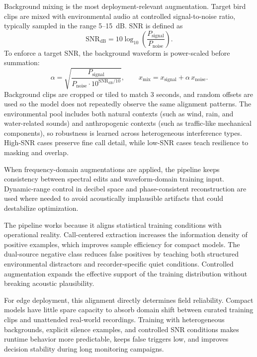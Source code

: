 \documentclass[a4paper,singleside,12pt]{report} %
\begin{document}
	Background mixing is the most deployment-relevant augmentation. Target bird clips are mixed with environmental audio at controlled signal-to-noise ratio, typically sampled in the range 5--15~dB. SNR is defined as
	\begin{equation}
		\mathrm{SNR}_{\mathrm{dB}} = 10 \log_{10}\!\left(\frac{P_{\mathrm{signal}}}{P_{\mathrm{noise}}}\right).
	\end{equation}
	To enforce a target SNR, the background waveform is power-scaled before summation:
	\begin{equation}
		\alpha = \sqrt{\frac{P_{\mathrm{signal}}}{P_{\mathrm{noise}} \cdot 10^{\mathrm{SNR}_{\mathrm{dB}}/10}}}, \qquad
		x_{\mathrm{mix}} = x_{\mathrm{signal}} + \alpha\,x_{\mathrm{noise}}.
	\end{equation}
	Background clips are cropped or tiled to match 3 seconds, and random offsets are used so the model does not repeatedly observe the same alignment patterns. The environmental pool includes both natural contexts (such as wind, rain, and water-related sounds) and anthropogenic contexts (such as traffic-like mechanical components), so robustness is learned across heterogeneous interference types. High-SNR cases preserve fine call detail, while low-SNR cases teach resilience to masking and overlap.

	When frequency-domain augmentations are applied, the pipeline keeps consistency between spectral edits and waveform-domain training input. Dynamic-range control in decibel space and phase-consistent reconstruction are used where needed to avoid acoustically implausible artifacts that could destabilize optimization.

	The pipeline works because it aligns statistical training conditions with operational reality. Call-centered extraction increases the information density of positive examples, which improves sample efficiency for compact models. The dual-source negative class reduces false positives by teaching both structured environmental distractors and recorder-specific quiet conditions. Controlled augmentation expands the effective support of the training distribution without breaking acoustic plausibility.

	For edge deployment, this alignment directly determines field reliability. Compact models have little spare capacity to absorb domain shift between curated training clips and unattended real-world recordings. Training with heterogeneous backgrounds, explicit silence examples, and controlled SNR conditions makes runtime behavior more predictable, keeps false triggers low, and improves decision stability during long monitoring campaigns.
\end{document}
